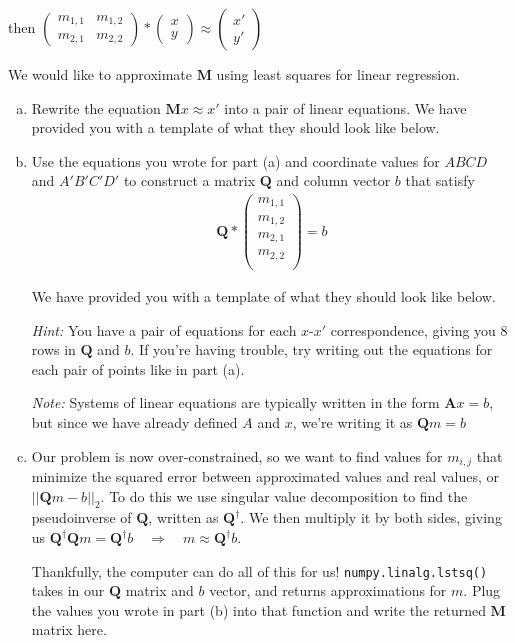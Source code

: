 then $\begin{pmatrix} m_{1,1} & m_{1,2} \\ m_{2,1} & m_{2,2} \end{pmatrix} * \begin{pmatrix} x \\ y \end{pmatrix} \approx \begin{pmatrix} x' \\ y' \end{pmatrix}$

We would like to approximate $\boldsymbol{M}$ using least squares for linear regression.

\begin{enumerate}[(a)]
\item Rewrite the equation $\boldsymbol{M}x \approx x'$ into a pair of linear equations. We have provided you with a template of what they should look like below.

\item Use the equations you wrote for part (a) and coordinate values for $ABCD$ and $A'B'C'D'$ to construct a matrix $\boldsymbol{Q}$ and column vector $b$ that satisfy
\begin{align}
    \boldsymbol{Q}*\begin{pmatrix} m_{1,1} \\ m_{1,2} \\ m_{2,1} \\ m_{2,2} \\ \end{pmatrix} = b
\end{align}

We have provided you with a template of what they should look like below.

\emph{Hint:} You have a pair of equations for each $x$-$x'$ correspondence, giving you $8$ rows in $\boldsymbol{Q}$ and $b$. If you're having trouble, try writing out the equations for each pair of points like in part (a).

\emph{Note:} Systems of linear equations are typically written in the form $\boldsymbol{A}x=b$, but since we have already defined $A$ and $x$, we're writing it as $\boldsymbol{Q}m=b$

\item Our problem is now over-constrained, so we want to find values for $m_{i,j}$ that minimize the squared error between approximated values and real values, or $||\boldsymbol{Q}m-b||_2$. To do this we use singular value decomposition to find the pseudoinverse of $\boldsymbol{Q}$, written as $\boldsymbol{Q}^\dagger$. We then multiply it by both sides, giving us $\boldsymbol{Q}^\dagger \boldsymbol{Q}m = \boldsymbol{Q}^\dagger b \quad\Rightarrow\quad m \approx \boldsymbol{Q}^\dagger b$.

Thankfully, the computer can do all of this for us! \texttt{numpy.linalg.lstsq()} takes in our $\boldsymbol{Q}$ matrix and $b$ vector, and returns approximations for $m$. Plug the values you wrote in part (b) into that function and write the returned $\boldsymbol{M}$ matrix here.
\end{enumerate}

